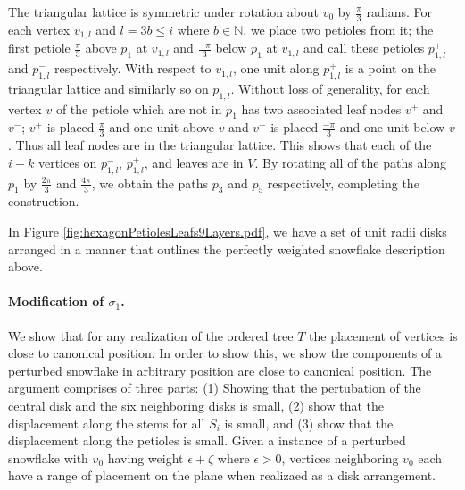 \documentclass[10pt]{CSUNthesis}
\theoremstyle{plain}%
\theoremstyle{definition}
\theoremstyle{remark}
\newcommand{\bbN}{{\mathbb{N}}}
\begin{document}
The triangular lattice is symmetric under rotation about $v_0$ by $\frac{\pi}{3}$ radians.  
For each vertex $v_{1,l}$ and $l = 3 b \leq i$ where $b \in \bbN$, we place two petioles from it; the first petiole $\frac{\pi}{3}$ above $p_1$ at $v_{1,l}$ and $\frac{-\pi}{3}$ below $p_1$ at $v_{1,l}$ and call these petioles $p_{1,l}^+$ and $p_{1,l}^-$ respectively.  
With respect to $v_{1,l}$, one unit along $p_{1,l}^+$ is a point on the triangular lattice and similarly so on $p_{1,l}^-$.  
Without loss of generality, for each vertex $v$ of the petiole which are not in $p_1$ has two associated leaf nodes $v^+$ and $v^-$; $v^+$ is placed $\frac{\pi}{3}$ and one unit above $v$ and $v^-$ is placed $\frac{-\pi}{3}$ and one unit below $v$.  
Thus all leaf nodes are in the triangular lattice.
This shows that each of the $i-k$ vertices on $p_{1,l}^-$, $p_{1,l}^+$, and leaves are in $V$.
By rotating all of the paths along $p_1$ by $\frac{2\pi}{3}$ and $\frac{4\pi}{3}$, we obtain the paths $p_3$ and $p_5$ respectively, completing the construction.

In Figure \ref{fig:hexagonPetiolesLeafs9Layers.pdf}, we have a set of unit radii disks arranged in a manner that outlines the perfectly weighted snowflake description above.

\paragraph{Modification of $\sigma_1$.}
We show that for any realization of the ordered tree $T$
 the placement of vertices is close to canonical position.  
In order to show this, we show the components of a perturbed snowflake in arbitrary position  are close to canonical position.  
The argument comprises of three parts: (1) Showing that the pertubation of the central disk and the six neighboring disks is small, (2) show that the displacement along the stems for all $S_i$ is small, and (3) show that the displacement along the petioles is small.  
Given a instance of a perturbed snowflake with $v_0$ having weight $\epsilon + \zeta$ where $\epsilon > 0$, vertices neighboring $v_0$ each have a range of placement on the plane when realizaed as a disk arrangement. 
\end{document}
